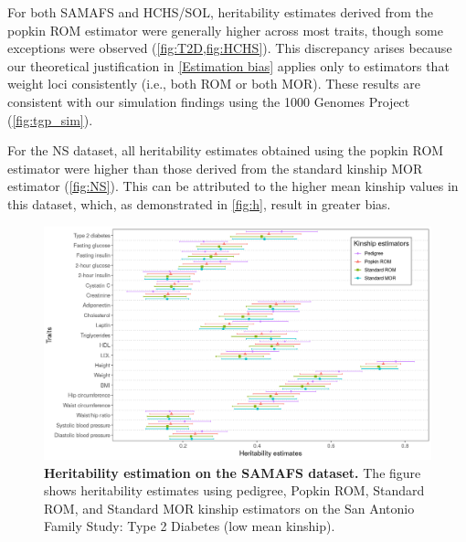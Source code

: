 \documentclass[11pt]{article}
\begin{document}
For both SAMAFS and HCHS/SOL, heritability estimates derived from the popkin ROM estimator were generally higher across most traits, though some exceptions were observed (\cref{fig:T2D,fig:HCHS}). This discrepancy arises because our theoretical justification in \ref{Estimation bias} applies only to estimators that weight loci consistently (i.e., both ROM or both MOR). These results are consistent with our simulation findings using the 1000 Genomes Project (\cref{fig:tgp_sim}). 

For the NS dataset, all heritability estimates obtained using the popkin ROM estimator were higher than those derived from the standard kinship MOR estimator (\cref{fig:NS}). This can be attributed to the higher mean kinship values in this dataset, which, as demonstrated in \cref{fig:h}, result in greater bias.



\begin{figure}[bp!]
  \centering
  \includegraphics[width=\textwidth]{data/Fig2_T2D_maf001_agesex.png}
  \caption{
    {\bf Heritability estimation on the SAMAFS dataset.}
    The figure shows heritability estimates using pedigree, Popkin ROM, Standard ROM, and Standard MOR kinship estimators on the San Antonio Family Study: Type 2 Diabetes (low mean kinship).
    }
  \label{fig:T2D}
\end{figure}
\end{document}
